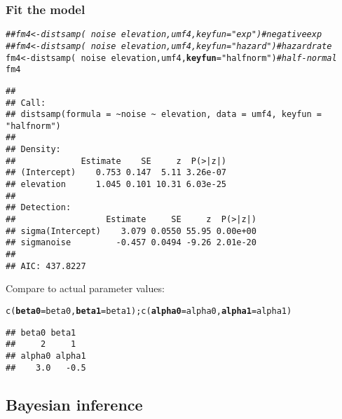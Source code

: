 \documentclass[color=usenames,dvipsnames]{beamer}\usepackage[]{graphicx}\usepackage[]{color}
\makeatletter
\newcommand{\hlstr}[1]{\textcolor[rgb]{0.749,0.012,0.012}{#1}}%
\newcommand{\hlcom}[1]{\textcolor[rgb]{0.514,0.506,0.514}{\textit{#1}}}%
\newcommand{\hlopt}[1]{\textcolor[rgb]{0,0,0}{#1}}%
\newcommand{\hlstd}[1]{\textcolor[rgb]{0,0,0}{#1}}%
\newcommand{\hlkwb}[1]{\textcolor[rgb]{0,0.341,0.682}{#1}}%
\newcommand{\hlkwc}[1]{\textcolor[rgb]{0,0,0}{\textbf{#1}}}%
\newcommand{\hlkwd}[1]{\textcolor[rgb]{0.004,0.004,0.506}{#1}}%
\newenvironment{kframe}{%
 \def\at@end@of@kframe{}%
 \ifinner\ifhmode%
  \def\at@end@of@kframe{\end{minipage}}%
  \begin{minipage}{\columnwidth}%
 \fi\fi%
 \def\FrameCommand##1{\hskip\@totalleftmargin \hskip-\fboxsep
 \colorbox{shadecolor}{##1}\hskip-\fboxsep
     \hskip-\linewidth \hskip-\@totalleftmargin \hskip\columnwidth}%
 \MakeFramed {\advance\hsize-\width
   \@totalleftmargin\z@ \linewidth\hsize
   \@setminipage}}%
 {\par\unskip\endMakeFramed%
 \at@end@of@kframe}
\newenvironment{knitrout}{}{} %
\makeatother
\begin{document}
\begin{frame}[fragile]
  \frametitle{Fit the model}
  \footnotesize
\begin{knitrout}\tiny
{}\color{fgcolor}\begin{kframe}
\begin{alltt}
\hlcom{## fm4 <- distsamp(~noise ~elevation, umf4, keyfun="exp")     # negative exp}
\hlcom{## fm4 <- distsamp(~noise ~elevation, umf4, keyfun="hazard")  # hazard rate}
\hlstd{fm4} \hlkwb{<-} \hlkwd{distsamp}\hlstd{(}\hlopt{~}\hlstd{noise} \hlopt{~}\hlstd{elevation, umf4,} \hlkwc{keyfun}\hlstd{=}\hlstr{"halfnorm"}\hlstd{)}   \hlcom{# half-normal}
\hlstd{fm4}
\end{alltt}
\begin{verbatim}
## 
## Call:
## distsamp(formula = ~noise ~ elevation, data = umf4, keyfun = "halfnorm")
## 
## Density:
##             Estimate    SE     z  P(>|z|)
## (Intercept)    0.753 0.147  5.11 3.26e-07
## elevation      1.045 0.101 10.31 6.03e-25
## 
## Detection:
##                  Estimate     SE     z  P(>|z|)
## sigma(Intercept)    3.079 0.0550 55.95 0.00e+00
## sigmanoise         -0.457 0.0494 -9.26 2.01e-20
## 
## AIC: 437.8227
\end{verbatim}
\end{kframe}
\end{knitrout}
\pause
\vfill
Compare to actual parameter values:
\vspace{-6pt}
\begin{knitrout}\tiny
{}\color{fgcolor}\begin{kframe}
\begin{alltt}
\hlkwd{c}\hlstd{(}\hlkwc{beta0}\hlstd{=beta0,} \hlkwc{beta1}\hlstd{=beta1);} \hlkwd{c}\hlstd{(}\hlkwc{alpha0}\hlstd{=alpha0,} \hlkwc{alpha1}\hlstd{=alpha1)}
\end{alltt}
\begin{verbatim}
## beta0 beta1 
##     2     1
## alpha0 alpha1 
##    3.0   -0.5
\end{verbatim}
\end{kframe}
\end{knitrout}
\end{frame}





\subsection{Bayesian inference}
\end{document}
